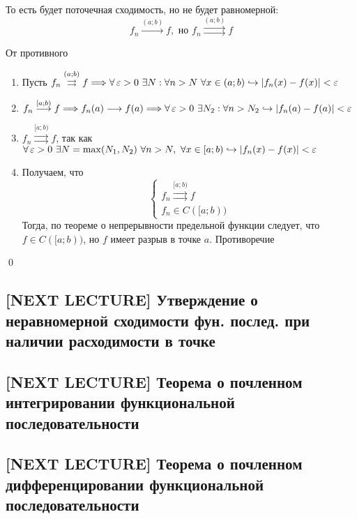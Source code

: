 \documentclass[a4paper]{article}
\begin{document}
То есть будет поточечная сходимость, но не будет равномерной:
\begin{equation*}
    f_n\overset{(a;b)}{\longrightarrow}f,\text{ но }f_n\overset{(a;b)}{\rightrightarrows} f
\end{equation*}

\proof От противного

\begin{enumerate}
    \item Пусть $f_n\overset{(a;b)}{\rightrightarrows} f\Longrightarrow \forall\operatorname{\varepsilon}>0\ \exists N:\forall n>N\ \forall x\in (a;b)\hookrightarrow|f_n(x)-f(x)|<\operatorname{\varepsilon}$
    \item $f_n\overset{[a;b)}{\longrightarrow} f \Longrightarrow f_n(a)\longrightarrow f(a)\Longrightarrow\forall\operatorname{\varepsilon}>0\ \exists N_2:\forall n>N_2\hookrightarrow|f_n(a)-f(a)|<\operatorname{\varepsilon}$
    \item $f_n\overset{[a;b)}{\rightrightarrows} f$, так как $\forall\operatorname{\varepsilon}>0\ \exists N=\max(N_1,N_2)\ \forall n>N,\ \forall x\in [a;b) \hookrightarrow|f_n(x)-f(x)|<\operatorname{\varepsilon}$
    \item Получаем, что 
    \begin{equation*}
        \begin{cases}
            f_n\overset{[a;b)}{\rightrightarrows} f\\
            f_n\in C([a;b))
        \end{cases}
    \end{equation*}
    Тогда, по теореме о непрерывности предельной функции следует, что $f\in C([a;b))$, но $f$ имеет разрыв в точке $a$. Противоречие
\end{enumerate}\qed

\subsection{[NEXT LECTURE] Утверждение о неравномерной сходимости фун. послед. при наличии расходимости в точке}

\subsection{[NEXT LECTURE] Теорема о почленном интегрировании функциональной последовательности}

\subsection{[NEXT LECTURE] Теорема о почленном дифференцировании функциональной последовательности}
\end{document}
